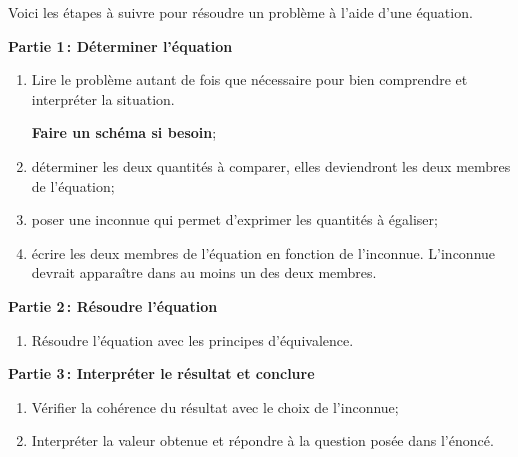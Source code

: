 \documentclass[a4paper,12pt]{article}
\begin{document}
Voici les étapes à suivre pour résoudre un problème à l'aide d'une équation.

{\bfseries Partie 1\,: Déterminer l'équation}
\begin{enumerate}[1)]
	\item Lire le problème autant de fois que nécessaire pour bien comprendre et interpréter la situation.

		{\bfseries Faire un schéma si besoin};
	\item déterminer les deux quantités à comparer, elles deviendront les deux membres de l'équation;
	\item poser une inconnue qui permet d'exprimer les quantités à égaliser;
	\item écrire les deux membres de l'équation en fonction de l'inconnue. L'inconnue devrait apparaître dans au moins un des deux membres.
\end{enumerate}
{\bfseries Partie 2\,: Résoudre l'équation}
\begin{enumerate}[1),resume]
	\item Résoudre l'équation avec les principes d'équivalence.
\end{enumerate}
{\bfseries Partie 3\,: Interpréter le résultat et conclure}
\begin{enumerate}[1),resume]
	\item Vérifier la cohérence du résultat avec le choix de l'inconnue;
	\item Interpréter la valeur obtenue et répondre à la question posée dans l'énoncé.
\end{enumerate}
\begin{exemple}
	\tcblower
	[Exemple 1]
	
\vspace{6.5cm}

\end{exemple}
\begin{exemple}
	\tcblower
	
\vspace{6.5cm}

\end{exemple}
\newpage
\end{document}
